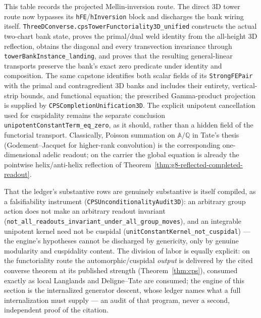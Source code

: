 \documentclass[11pt]{article}
\theoremstyle{definition}
\begin{document}
\noindent This table records the projected Mellin-inversion route.  The direct 3D tower route now
bypasses its \texttt{hFE}/\texttt{hInversion} block and discharges the bank wiring itself.
\texttt{ThreeDConverse.cpsTowerFunctoriality3D\_unified} constructs the actual two-chart bank state,
proves the primal/dual weld identity from the all-height 3D reflection, obtains the diagonal and every
transvection invariance through \texttt{towerBankInstance\_landing}, and proves that the resulting
general-linear transports preserve the bank's exact zero predicate under identity and composition.
The same capstone identifies both scalar fields of its \texttt{StrongFEPair} with the primal and
contragredient 3D banks and includes their entirety, vertical-strip bounds, and functional equation;
the prescribed Gamma-product projection is supplied by \texttt{CPSCompletionUnification3D}.  The
explicit unipotent cancellation used for cuspidality remains the separate conclusion
\texttt{unipotentConstantTerm\_eq\_zero}, as it should, rather than a hidden field of the functorial
transport.  Classically, Poisson summation on $\mathbb A/\mathbb Q$ in Tate's
thesis \cite{Tate} (Godement--Jacquet \cite{GJa} for higher-rank convolution) is the corresponding
one-dimensional adelic readout; on the carrier the global equation is already the pointwise
helix/anti-helix reflection of Theorem~\ref{thm:g8-reflected-completed-readout}.

That the ledger's substantive rows are genuinely substantive is itself compiled, as a
falsifiability instrument (\texttt{CPSUnconditionalityAudit3D}): an arbitrary group action does
not make an arbitrary readout invariant
(\texttt{not\_all\_readouts\_invariant\_under\_all\_group\_moves}), and an integrable unipotent
kernel need not be cuspidal (\texttt{unitConstantKernel\_not\_cuspidal}) --- the engine's
hypotheses cannot be discharged by genericity, only by genuine modularity and cuspidality
content.  The division of labor is equally explicit: on the functoriality route the
automorphic/cuspidal \emph{output} is delivered by the cited converse theorem at its published
strength (Theorem~\ref{thm:cps}), consumed exactly as local Langlands and Deligne--Tate are
consumed; the engine of this section is the internalized generator descent, whose ledger names
what a full internalization must supply --- an audit of that program, never a second,
independent proof of the citation.
\end{document}

